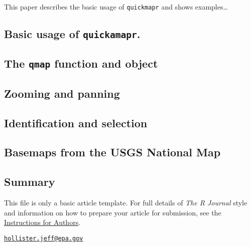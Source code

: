 This paper describes the basic usage of \texttt{quickmapr} and shows
examples\ldots{}

\subsection{\texorpdfstring{Basic usage of
\texttt{quickamapr}.}{Basic usage of quickamapr.}}\label{basic-usage-of-quickamapr.}

\subsection{\texorpdfstring{The \texttt{qmap} function and
object}{The qmap function and object}}\label{the-qmap-function-and-object}

\subsection{Zooming and panning}\label{zooming-and-panning}

\subsection{Identification and
selection}\label{identification-and-selection}

\subsection{Basemaps from the USGS National
Map}\label{basemaps-from-the-usgs-national-map}

\subsection{Summary}\label{summary}

This file is only a basic article template. For full details of
\emph{The R Journal} style and information on how to prepare your
article for submission, see the
\href{https://journal.r-project.org/share/author-guide.pdf}{Instructions
for Authors}.



\address{%
Jeffrey W. Hollister\\
U.S. Environmental Protection Agency\\
Office of Research and Development\\ National Health and Environmental Effects Research Laboratory\\ Atlantic Ecology Division\\ 27 Tarzwell Drive\\ Narragansett, RI 02882\\
}
\href{mailto:hollister.jeff@epa.gov}{\nolinkurl{hollister.jeff@epa.gov}}

